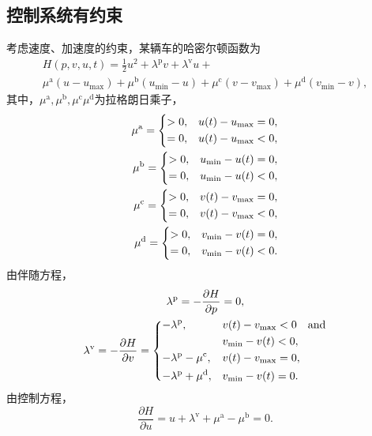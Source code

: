 \subsection{控制系统有约束}
\label{ssec:c}
考虑速度、加速度的约束，某辆车的哈密尔顿函数为
\begin{multline}
H(p,v,u,t)=\frac12u^2+\lambda^\mathrm{p}v + \lambda^\mathrm{v}u+\\
\mu^\mathrm{a}(u-u_{\max})+\mu^\mathrm{b}(u_{\min}-u)+\mu^\mathrm{c}(v-v_{\max})+\mu^\mathrm{d}(v_{\min}-v),
\end{multline}
其中，$\mu^\mathrm{a},\mu^\mathrm{b},\mu^\mathrm{c}\mu^\mathrm{d}$为拉格朗日乘子，
\begin{align}
\mu^\mathrm{a}=\begin{dcases}
>0, & u(t)-u_{\max}=0,\\
=0, & u(t)-u_{\max}<0,
\end{dcases}\\
\mu^\mathrm{b}=\begin{dcases}
>0, & u_{\min}-u(t)=0,\\
=0, & u_{\min}-u(t)<0,
\end{dcases}\\
\mu^\mathrm{c}=\begin{dcases}
>0, & v(t)-v_{\max}=0,\\
=0, & v(t)-v_{\max}<0,
\end{dcases}\\
\mu^\mathrm{d}=\begin{dcases}
>0, & v_{\min}-v(t)=0,\\
=0, & v_{\min}-v(t)<0.
\end{dcases}
\end{align}
由伴随方程，
\begin{gather}
\lambda^\mathrm{p}=-\frac{\partial H}{\partial p} = 0,\\
\lambda^\mathrm{v}=-\frac{\partial H}{\partial v} =
\begin{dcases}
-\lambda^\mathrm{p}, & v(t)-v_{\max}<0 \quad \text{and}\\ & v_{\min}-v(t)<0,\\
-\lambda^\mathrm{p}-\mu^\mathrm{c}, & v(t)-v_{\max}=0,\\
-\lambda^\mathrm{p}+\mu^\mathrm{d}, & v_{\min}-v(t)=0.
\end{dcases}
\end{gather}
由控制方程，
\begin{equation}
\frac{\partial H}{\partial u}=u+\lambda^\mathrm{v}+\mu^\mathrm{a}-\mu^\mathrm{b}=0.
\end{equation}

